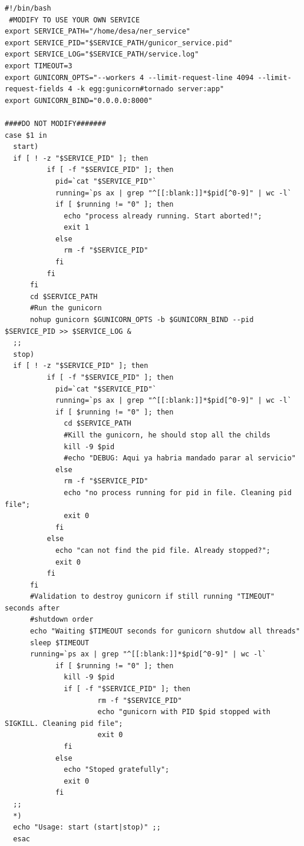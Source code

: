 \documentclass[a4paper,11pt]{article}
\begin{document}
\begin{verbatim}
#!/bin/bash
 #MODIFY TO USE YOUR OWN SERVICE
export SERVICE_PATH="/home/desa/ner_service"
export SERVICE_PID="$SERVICE_PATH/gunicor_service.pid"
export SERVICE_LOG="$SERVICE_PATH/service.log"
export TIMEOUT=3
export GUNICORN_OPTS="--workers 4 --limit-request-line 4094 --limit-request-fields 4 -k egg:gunicorn#tornado server:app"
export GUNICORN_BIND="0.0.0.0:8000"

####DO NOT MODIFY#######
case $1 in
  start)
  if [ ! -z "$SERVICE_PID" ]; then
          if [ -f "$SERVICE_PID" ]; then
            pid=`cat "$SERVICE_PID"`
            running=`ps ax | grep "^[[:blank:]]*$pid[^0-9]" | wc -l`
            if [ $running != "0" ]; then
              echo "process already running. Start aborted!";
              exit 1
            else
              rm -f "$SERVICE_PID"
            fi
          fi
      fi
      cd $SERVICE_PATH
      #Run the gunicorn
      nohup gunicorn $GUNICORN_OPTS -b $GUNICORN_BIND --pid $SERVICE_PID >> $SERVICE_LOG &
  ;;
  stop)
  if [ ! -z "$SERVICE_PID" ]; then
          if [ -f "$SERVICE_PID" ]; then
            pid=`cat "$SERVICE_PID"`
            running=`ps ax | grep "^[[:blank:]]*$pid[^0-9]" | wc -l`
            if [ $running != "0" ]; then
              cd $SERVICE_PATH
              #Kill the gunicorn, he should stop all the childs
              kill -9 $pid
              #echo "DEBUG: Aqui ya habria mandado parar al servicio"
            else
              rm -f "$SERVICE_PID"
              echo "no process running for pid in file. Cleaning pid file";
              exit 0
            fi
          else
            echo "can not find the pid file. Already stopped?";
            exit 0
          fi
      fi
      #Validation to destroy gunicorn if still running "TIMEOUT" seconds after 
      #shutdown order
      echo "Waiting $TIMEOUT seconds for gunicorn shutdow all threads"
      sleep $TIMEOUT
      running=`ps ax | grep "^[[:blank:]]*$pid[^0-9]" | wc -l`
            if [ $running != "0" ]; then
              kill -9 $pid
              if [ -f "$SERVICE_PID" ]; then
                      rm -f "$SERVICE_PID"
                      echo "gunicorn with PID $pid stopped with SIGKILL. Cleaning pid file";
                      exit 0
              fi
            else
              echo "Stoped gratefully";
              exit 0
            fi
  ;;
  *)
  echo "Usage: start (start|stop)" ;;
  esac
\end{verbatim}


\newpage
\end{document}
